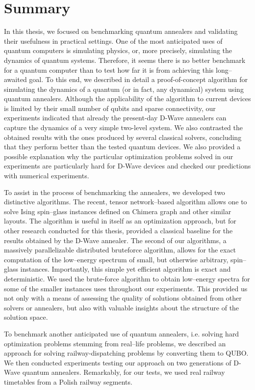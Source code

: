 \chapter*{Summary}

In this thesis, we focused on benchmarking quantum annealers and validating their
usefulness in practical settings. One of the most anticipated uses of quantum computers
is simulating physics, or, more precisely, simulating the dynamics of quantum systems.
Therefore, it seems there is no better benchmark for a quantum computer than to test
how far it is from achieving this long--awaited goal. To this end, we described in detail a
proof-of-concept algorithm for simulating the dynamics of a quantum (or in fact, any
dynamical) system using quantum annealers. Although the applicability of the algorithm
to current devices is limited by their small number of qubits and sparse connectivity,
our experiments indicated that already the present-day D-Wave annealers can capture
the dynamics of a very simple two-level system. We also contrasted the obtained results
with the ones produced by several classical solvers, concluding that they perform better
than the tested quantum devices. We also provided a possible explanation why the
particular optimization problems solved in our experiments are particularly hard for
D-Wave devices and checked our predictions with numerical experiments.

To assist in the process of benchmarking the annealers, we developed two distinctive
algorithms. The recent, tensor network--based algorithm allows one to solve Ising
spin--glass instances defined on Chimera graph and other similar layouts. The algorithm
is useful in itself as an optimization approach, but for other research conducted for
this thesis, provided a classical baseline for the results obtained by the D-Wave
annealer. The second of our algorithms, a massively parallelizable distributed bruteforce
algorithm, allows for the exact computation of the low--energy spectrum of small,
but otherwise arbitrary, spin--glass instances. Importantly, this simple yet
efficient algorithm is exact and deterministic. We used the brute-force algorithm
to obtain low--energy spectra for some of the smaller instances uses throughout
our experiments. This provided us not only with a means of assessing the quality of
solutions obtained from other solvers or annealers, but also with valuable
insights about the structure of the solution space.

To benchmark another anticipated use of quantum annealers, i.e. solving hard
optimization problems stemming from real--life problems, we described an approach
for solving railway-dispatching problems by converting them to QUBO. We then
conducted experiments testing our approach on two generations of D-Wave quantum
annealers. Remarkably, for our tests, we used real railway timetables from a Polish
railway segments.

